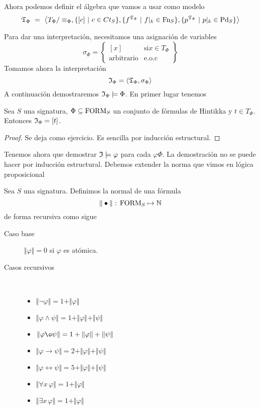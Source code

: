 Ahora podemos definir el álgebra que vamos a usar como modelo
\[ \mathfrak{T}_{\Phi}\ =\ \bigl\langle
  T_{\Phi}/\equiv_{\Phi},\{[c]\ |\ c\in Ct_{S}\},
  \{f^{\mathfrak{T}_{\Phi}}\ |\ f|_{k}\in \mbox{Fn}_{S}\},
  \{p^{\mathfrak{T}_{\Phi}}\ |\ p|_{k}\in \mbox{Pd}_{S}\}
  \bigr\rangle \]

Para dar una interpretación, necesitamos una asignación de variables
\[ \sigma_{\Phi}=\left\{
    \begin{array}{ll}
      [x] & \mbox{si} x\in T_{\Phi}\\
      \mbox{arbitrario} & \mbox{e.o.c}
    \end{array}
  \right\} \]
Tomamos ahora la interpretación
\[ \mathfrak{I}_{\Phi} = \langle \mathfrak{T}_{\Phi}, \sigma_{\Phi}\rangle \]
A continuación demostraremos $\mathfrak{I}_{\Phi}\models\Phi$. En primer lugar tenemos
\begin{prop}
  Sea $S$ una signatura, $\Phi\subseteq\mbox{FORM}_{S}$ un conjunto de fórmulas de Hintikka y $t\in T_{\Phi}$. Entonces $\mathfrak{I}_{\Phi}=[t]$.

  \begin{proof}
    Se deja como ejercicio. Es sencilla por inducción estructural.
  	\end{proof}
	\end{prop}

Tenemos ahora que demostrar $\mathfrak{I}\models\varphi$ para cada $\varphi\Phi$. La demostración no se puede hacer por inducción estructural. Debemos extender la norma que vimos en lógica proposicional
\begin{definition}
  Sea $S$ una signatura. Definimos la normal de una fórmula 
\[ \Vert \bullet \Vert: \, \mbox{FORM}_{S}\mapsto \mathbb{N} \]  
   de forma recursiva como sigue
  \begin{description}
  \item[Caso base]\label{le:casobase} $\Vert \varphi \Vert=0$ si $\varphi$ es atómica.

  \item[Casos recursivos] \mbox{ }
    \begin{itemize}
    \item $\Vert\neg\varphi\Vert=1+\Vert\varphi\Vert$
    \item $\Vert\varphi\wedge\psi\Vert=1+\Vert\varphi\Vert+\Vert\psi\Vert$
    \item $\Vert\varphi\o\psi\Vert=1+\Vert\varphi\Vert+\Vert\psi\Vert$
    \item $\Vert\varphi\rightarrow\psi\Vert=2+\Vert\varphi\Vert+\Vert\psi\Vert$
    \item $\Vert\varphi \leftrightarrow \psi\Vert=5+\Vert\varphi\Vert+\Vert\psi\Vert$
    \item $\Vert\forall x\,\varphi\Vert=1+\Vert\varphi\Vert$
    \item $\Vert\exists x\,\varphi\Vert=1+\Vert\varphi\Vert$
    \end{itemize}
  \end{description}
\end{definition}

